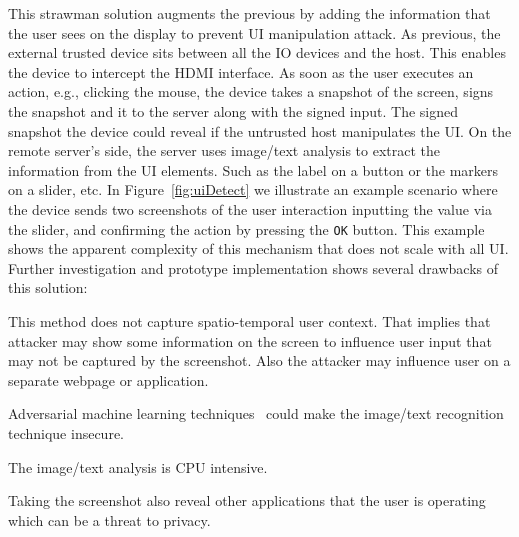 This strawman solution augments the previous by adding the information that the user sees on the display to prevent UI manipulation attack. As previous, the external trusted device sits between all the IO devices and the host. This enables the device to intercept the HDMI interface. As soon as the user executes an action, e.g., clicking the mouse, the device takes a snapshot of the screen, signs the snapshot and it to the server along with the signed input. The signed snapshot the device could reveal if the untrusted host manipulates the UI. On the remote server's side, the server uses image/text analysis to extract the information from the UI elements. Such as the label on a button or the markers on a slider, etc. In Figure~\ref{fig:uiDetect} we illustrate an example scenario where the device sends two screenshots of the user interaction \one inputting the value via the slider, and \two confirming the action by pressing the \texttt{OK} button.
This example shows the apparent complexity of this mechanism that does not scale with all UI. Further investigation and prototype implementation shows several drawbacks of this solution:


\begin{mylist}
  \item This method does not capture spatio-temporal user context. That implies that attacker may show some information on the screen to influence user input that may not be captured by the screenshot. Also the attacker may influence user on a separate webpage or application.
  \item Adversarial machine learning techniques~\cite{eykholt2017robust,sitawarin2018rogue} could make the image/text recognition technique insecure.
  \item The image/text analysis is CPU intensive.
  \item Taking the screenshot also reveal other applications that the user is operating which can be a threat to privacy.
\end{mylist}



